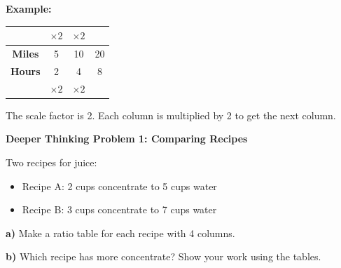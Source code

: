 \documentclass[12pt, letterpaper, fleqn]{article}
\begin{document}
\begin{tcolorbox}[colback=white, colframe=black!25, boxrule=0.6pt, arc=4mm, left=6mm, right=6mm, top=5mm, bottom=5mm]

\textbf{Example:}

\begin{center}
\begin{tabular}{|c|c|c|c|}
\hline
& $\times 2$ & $\times 2$ & \\
\hline
\textbf{Miles} & 5 & 10 & 20 \\
\hline
\textbf{Hours} & 2 & 4 & 8 \\
\hline
& $\times 2$ & $\times 2$ & \\
\hline
\end{tabular}
\end{center}

\noindent
The scale factor is 2. Each column is multiplied by 2 to get the next column.

\end{tcolorbox}

\vspace{4mm}

\begin{tcolorbox}[colback=yellow!15, colframe=orange, boxrule=1.5pt, arc=4mm, left=6mm, right=6mm, top=5mm, bottom=5mm]

\textbf{Deeper Thinking Problem 1: Comparing Recipes}

\medskip

\noindent
Two recipes for juice:
\begin{itemize}
    \item Recipe A: 2 cups concentrate to 5 cups water
    \item Recipe B: 3 cups concentrate to 7 cups water
\end{itemize}

\noindent
\textbf{a)} Make a ratio table for each recipe with 4 columns.

\vspace{3cm}

\noindent
\textbf{b)} Which recipe has more concentrate? Show your work using the tables.

\vspace{2cm}

\end{tcolorbox}

\newpage
\end{document}
